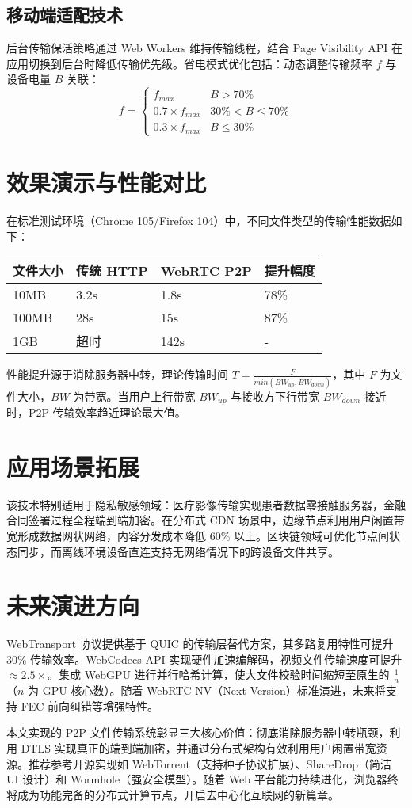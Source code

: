 \section{移动端适配技术}
后台传输保活策略通过 Web Workers 维持传输线程，结合 Page Visibility API 在应用切换到后台时降低传输优先级。省电模式优化包括：动态调整传输频率 $f$ 与设备电量 $B$ 关联：
$$ f = \begin{cases} f_{max} & B > 70\% \\ 0.7 \times f_{max} & 30\% < B \leq 70\% \\ 0.3 \times f_{max} & B \leq 30\% \end{cases} $$\par
\chapter{效果演示与性能对比}
在标准测试环境（Chrome 105/Firefox 104）中，不同文件类型的传输性能数据如下：\par
\begin{table}[H]
\centering
\begin{tabular}{|l|l|l|l|}
\hline
文件大小 & 传统 HTTP & WebRTC P2P & 提升幅度 \\
\hline
10MB & 3.2s & 1.8s & 78\%{} \\
\hline
100MB & 28s & 15s & 87\%{} \\
\hline
1GB & 超时 & 142s & - \\
\hline
\end{tabular}
\end{table}
性能提升源于消除服务器中转，理论传输时间 $T = \frac{F}{min(BW_{up}, BW_{down})}$，其中 $F$ 为文件大小，$BW$ 为带宽。当用户上行带宽 $BW_{up}$ 与接收方下行带宽 $BW_{down}$ 接近时，P2P 传输效率趋近理论最大值。\par
\chapter{应用场景拓展}
该技术特别适用于隐私敏感领域：医疗影像传输实现患者数据零接触服务器，金融合同签署过程全程端到端加密。在分布式 CDN 场景中，边缘节点利用用户闲置带宽形成数据网状网络，内容分发成本降低 60\%{} 以上。区块链领域可优化节点间状态同步，而离线环境设备直连支持无网络情况下的跨设备文件共享。\par
\chapter{未来演进方向}
WebTransport 协议提供基于 QUIC 的传输层替代方案，其多路复用特性可提升 30\%{} 传输效率。WebCodecs API 实现硬件加速编解码，视频文件传输速度可提升 $\approx 2.5\times$。集成 WebGPU 进行并行哈希计算，使大文件校验时间缩短至原生的 $\frac{1}{n}$（$n$ 为 GPU 核心数）。随着 WebRTC NV（Next Version）标准演进，未来将支持 FEC 前向纠错等增强特性。\par
本文实现的 P2P 文件传输系统彰显三大核心价值：彻底消除服务器中转瓶颈，利用 DTLS 实现真正的端到端加密，并通过分布式架构有效利用用户闲置带宽资源。推荐参考开源实现如 WebTorrent（支持种子协议扩展）、ShareDrop（简洁 UI 设计）和 Wormhole（强安全模型）。随着 Web 平台能力持续进化，浏览器终将成为功能完备的分布式计算节点，开启去中心化互联网的新篇章。\par
